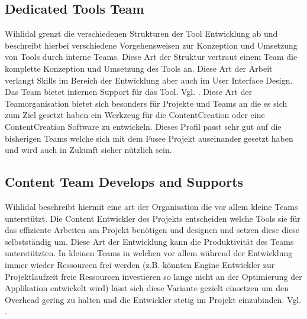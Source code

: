 \documentclass[pagesize, paper=a4, fontsize=12pt, titlepage=true, headings=small, headnosepline, abstractoff, liststotoc, nochapterprefix, plainheadsepline, twoside]{scrreprt}
\begin{document}
\subsection{Dedicated Tools Team}
Wihlidal grenzt die verschiedenen Strukturen der Tool Entwicklung ab und beschreibt hierbei verschiedene Vorgehensweisen zur Konzeption und Umsetzung von Tools durch interne Teams.
Diese Art der Struktur vertraut einem Team die komplette Konzeption und Umsetzung des Tools an. Diese Art der Arbeit verlangt Skills im Bereich der Entwicklung aber auch im User Interface Design. Das Team bietet internen Support für das Tool. Vgl. \cite{Wihlidal2006}. Diese Art der Teamorganisation bietet sich besonders für Projekte und Teams an die es sich zum Ziel gesetzt haben ein Werkzeug für die ContentCreation oder eine ContentCreation Software zu entwickeln. Dieses Profil passt sehr gut auf die bisherigen Teams welche sich mit dem Fusee Projekt auseinander gesetzt haben und wird auch in Zukunft sicher nützlich sein.

\subsection{Content Team Develops and Supports}
Wihlidal beschreibt hiermit eine art der Organisation die vor allem kleine Teams unterstützt. Die Content Entwickler des Projekts entscheiden welche Tools sie für das effiziente Arbeiten am Projekt benötigen und designen und setzen diese diese selbstständig um. Diese Art der Entwicklung kann die Produktivität des Teams unterstützten. In kleinen Teams in welchen vor allem während der Entwicklung immer wieder Ressourcen frei werden (z.B. könnten Engine Entwickler zur Projektlaufzeit freie Ressourcen investieren so lange nicht an der Optimierung der Applikation entwickelt wird) lässt sich diese Variante gezielt einsetzen um den Overhead gering zu halten und die Entwickler stetig im Projekt einzubinden. Vgl. \cite{Wihlidal2006}.
\end{document}
